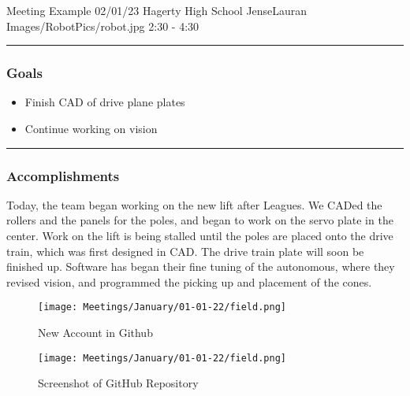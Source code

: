 \insertmeeting 
	{Meeting Example} 
	{02/01/23} 
	{Hagerty High School}
	{JenseLauran}
	{Images/RobotPics/robot.jpg}
	{2:30 - 4:30}
	
\noindent\hfil\rule{\textwidth}{.4pt}\hfil
\subsubsection*{Goals}
\begin{itemize}
    \item Finish CAD of drive plane plates
    \item Continue working on vision
\end{itemize} 

\noindent\hfil\rule{\textwidth}{.4pt}\hfil

\subsubsection*{Accomplishments}
Today, the team began working on the new lift after Leagues. We CADed the rollers and the panels for the poles, and began to work on the servo plate in the center. Work on the lift is being stalled until the poles are placed onto the drive train, which was first designed in CAD. The drive train plate will soon be finished up. Software has began their fine tuning of the autonomous, where they revised vision, and programmed the picking up and placement of the cones.
 

\begin{figure}[ht]
\centering
\begin{minipage}[b]{.48\textwidth}
  \centering
  \texttt{[image: Meetings/January/01-01-22/field.png]}
  \caption{New Account in Github}
  \label{fig:pic1}
\end{minipage}%
\hfill%
\begin{minipage}[b]{.48\textwidth}
  \centering
  \texttt{[image: Meetings/January/01-01-22/field.png]}
  \caption{Screenshot of GitHub Repository}
  \label{fig:pic2}
\end{minipage}
\end{figure}


